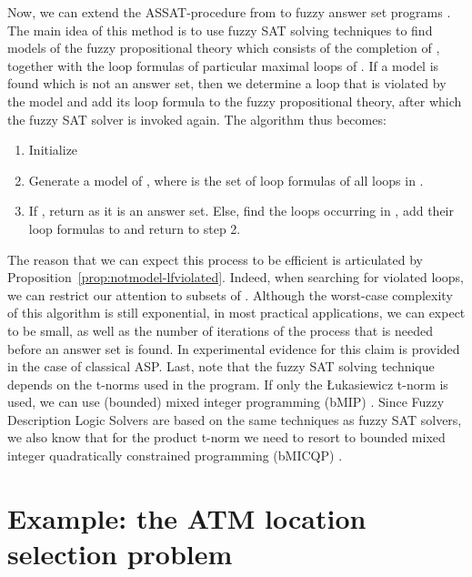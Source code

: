 \documentclass{tlp}
\begin{document}
Now, we can extend the ASSAT-procedure from \cite{assat-linzhao} to fuzzy answer set programs . The main idea of this method is to use fuzzy SAT solving techniques to find models of the fuzzy propositional theory which consists of the completion of , together with the loop formulas of particular maximal loops of . If a model is found which is not an answer set, then we determine a loop that is violated by the model and add its loop formula to the fuzzy propositional theory, after which the fuzzy SAT solver is invoked again. The algorithm thus becomes:

\begin{enumerate}
 \item Initialize 
 \item Generate a model  of , where  is the set of loop formulas of all loops in .
 \item If , return  as it is an answer set. Else, find the loops occurring in , add their loop formulas to  and return to step 2.
\end{enumerate}

The reason that we can expect this process to be efficient is articulated by Proposition~\ref{prop:notmodel-lfviolated}. Indeed, when searching for violated loops, we can restrict our attention to subsets of . Although the worst-case complexity of this algorithm is still exponential, in most practical applications, we can expect  to be small, as well as the number of iterations of the process that is needed before an answer set is found. In \cite{assat-linzhao} experimental evidence for this claim is provided in the case of classical ASP. Last, note that the fuzzy SAT solving technique depends on the t-norms used in the program. If only the \L ukasiewicz t-norm is used, we can use (bounded) mixed integer programming (bMIP) \cite{ManyValuedMixedInteger}. Since Fuzzy Description Logic Solvers are based on the same techniques as fuzzy SAT solvers, we also know that for the
product t-norm we need to resort to bounded mixed integer quadratically constrained programming (bMICQP) \cite{BobilloStraccia}.





\section{Example: the ATM location selection problem}\label{sec:example}
\end{document}
